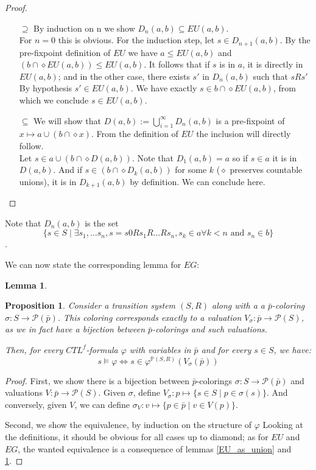 \documentclass[11pt]{article}
\newtheorem{proposition}[definition]{Proposition}
\newtheorem{lemma}[definition]{Lemma}
\begin{document}
\begin{proof}
    \begin{itemize}
        \item[$\supseteq$] By induction on n we show $D_n(a,b) \subseteq EU(a,b)$.\\ For $n=0$ this is obvious. For the induction step, let $s\in D_{n+1}(a,b)$. By the pre-fixpoint definition of $EU$ we have $a\leq EU(a,b)$ and $(b\cap\diamond EU(a,b))\leq EU(a,b)$. It follows that if $s$ is in $a$, it is directly in $EU(a,b)$; and in the other case, there exists $s'$ in $D_n(a,b)$ such that $sRs'$ By hypothesis $s'\in EU(a,b)$. We have exactly $s\in b\cap\diamond EU(a,b)$, from which we conclude $s\in EU(a,b)$.
        \item[$\subseteq$] We will show that $D(a,b) := \bigcup_{i=1}^{\infty}D_n(a,b)$ is a pre-fixpoint of $x \mapsto a \cup (b \cap \diamond x)$. From the definition of $EU$ the inclusion will directly follow.\\ Let $s\in a \cup (b \cap \diamond D(a,b))$. Note that $D_1(a,b)=a$ so if $s\in a$ it is in $D(a,b)$. And if $s\in (b \cap \diamond D_k(a,b))$ for some $k$ ($\diamond$ preserves countable unions), it is in $D_{k+1}(a,b)$ by definition. We can conclude here.
    \end{itemize}
\end{proof}
Note that $D_n(a,b)$ is the set $$\{s\in S\mid \exists s_1,...s_n, s=s0Rs_1R...Rs_n, s_k\in a \forall k<n \mbox{ and } s_n \in b\}$$.

We can now state the corresponding lemma for $EG$:
\begin{lemma}\label{EG_as_inters}
    
\end{lemma}

\begin{proposition}\label{equiv_complex_alg}
    Consider a transition system $(S,R)$ along with a a $\bar{p}$-coloring $\sigma : S \to \mathcal{P}(\bar{p})$. This coloring corresponds exactly to a valuation $V_\sigma:\bar{p}\to \mathcal{P}(S)$, as we in fact have a bijection between $\bar{p}$-colorings and such valuations.

    Then, for every $CTL^f$-formula $\varphi$ with variables in $\bar{p}$ and for every $s\in S$, we have: $$s\models\varphi \Longleftrightarrow s\in\varphi^{\mathbb{P}(S,R)}(V_\sigma(\bar{p}))$$
\end{proposition}

\begin{proof}
    First, we show there is a bijection between $\bar{p}$-colorings $\sigma:S \to \mathcal{P}(\bar{p})$ and valuations $V:\bar{p}\to \mathcal{P}(S)$. Given $\sigma$, define $V_\sigma: p\mapsto\{s\in S \mid p\in \sigma(s)\}$. And conversely, given $V$, we can define $\sigma_V: v\mapsto\{p\in\bar{p}\mid v\in V(p)\}$.

    Second, we show the equivalence, by induction on the structure of $\varphi$ Looking at the definitions, it should be obvious for all cases up to diamond; as for $EU$ and $EG$, the wanted equivalence is a consequence of lemmas \ref{EU_as_union} and \ref{EG_as_inters}.
\end{proof}
\end{document}
